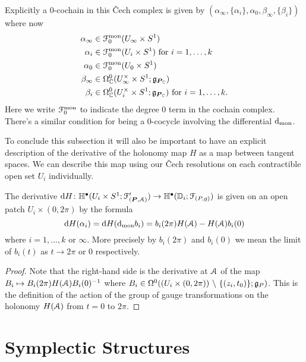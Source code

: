 \documentclass[10pt, oneside]{article}
\renewcommand{\d}{\mathrm{d}}
\begin{document}
Explicitly a 0-cochain in this \v Cech complex is given by $(\alpha_\infty, \{\alpha_i\}, \alpha_0, \beta_\infty, \{\beta_i\})$ where now 
\begin{align*}
 \alpha_\infty &\in \mathcal{F}^{\mathrm{mon}}_0(U_\infty \times S^1) \\
 \alpha_i &\in \mathcal{F}^{\mathrm{mon}}_0(U_i\times S^1) \text{ for } i = 1,\ldots,k \\
 \alpha_0 &\in \mathcal{F}^{\mathrm{mon}}_0(U_0\times S^1) \\
 \beta_\infty &\in \Omega^0_{\mathbb{C}}(U_\infty^\times \times S^1; \mathfrak{g}_{\boldsymbol{P}_{\mathbb{C}}}) \\
 \beta_i &\in \Omega^0_{\mathbb{C}}(U_i^\times \times S^1; \mathfrak{g}_{\boldsymbol{P}_{\mathbb{C}}}) \text{ for } i=1,\ldots,k.
\end{align*}
Here we write $\mathcal{F}^{\mathrm{mon}}_0$ to indicate the degree 0 term in the cochain complex.  There's a similar condition for being a 0-cocycle involving the differential $\d_{\mr{mon}}$.  %

To conclude this subsection it will also be important to have an explicit description of the derivative of the holonomy map $H$ as a map between tangent spaces.  We can describe this map using our \v Cech resolutions on each contractible open set $U_i$ individually.

\begin{prop} \label{local_derivative_description_prop}
The derivative $\d H \colon \bb H^\bullet(U_i \times S^1 ; \mc F'_{(\bo P,\mc A)}) \to \bb H^\bullet(\bb D_i; \mc F_{(P,g)})$ is given on an open patch $U_i \times (0,2\pi)$ by the formula
\[\d H(\alpha_i) = \d H(\d_{\mr{mon}} b_i) = b_i(2\pi)H(\mc A) - H(\mc A)b_i(0)\]
where $i = 1, \ldots, k$ or $\infty$.  More precisely by $b_i(2\pi)$ and $b_i(0)$ we mean the limit of $b_i(t)$ as $t \to 2\pi$ or 0 respectively.
\end{prop}

\begin{proof}
Note that the right-hand side is the derivative at $\mathcal{A}$ of the map $B_i \mapsto B_i(2\pi)H(\mathcal{A})B_i(0)^{-1}$ where $B_i \in \Omega^0((U_i \times (0,2\pi)) \ \backslash \  \{(z_i, t_0)\}; \mathfrak{g}_P)$.  This is the definition of the action of the group of gauge transformations on the holonomy $H(\mathcal{A})$ from $t=0$ to $2\pi$. 
\end{proof}

\section{Symplectic Structures} \label{symp_section}
\end{document}
